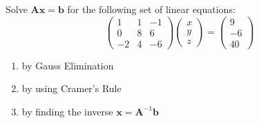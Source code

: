 Solve $\boldsymbol{A}\boldsymbol{x}=\boldsymbol{b}$ for the following set of linear equations:
\begin{equation*}
	\begin{pmatrix}
		1&1&-1\\0&8&6\\-2&4&-6
	\end{pmatrix}
	\begin{pmatrix}
		x\\y\\z
	\end{pmatrix}
	=
	\begin{pmatrix}
		9\\-6\\40
	\end{pmatrix}
\end{equation*}
	\begin{enumerate}
		\item by Gauss Elimination
		\item by using Cramer's Rule
		\item by finding the inverse $\boldsymbol{x}=\boldsymbol{A}^{-1}\boldsymbol{b}$
	\end{enumerate}

